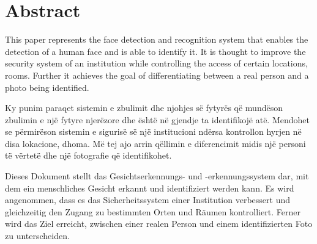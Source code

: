 \chapter*{Abstract}


\begin{flushleft}
	This paper represents the face detection and recognition system that enables the detection of a human face and is able to identify it. It is thought to improve the security system of an institution while controlling the access of certain locations, rooms. Further it achieves the goal of differentiating between a real person and a photo being identified. \\
\end{flushleft}
\begin{flushleft}
	Ky punim paraqet sistemin e zbulimit dhe njohjes së fytyrës që mundëson zbulimin e një fytyre njerëzore dhe është në gjendje ta identifikojë atë. Mendohet se përmirëson sistemin e sigurisë së një institucioni ndërsa kontrollon hyrjen në disa lokacione, dhoma. Më tej ajo arrin qëllimin e diferencimit midis një personi të vërtetë dhe një fotografie që identifikohet.
\end{flushleft}
\begin{flushleft}
	Dieses Dokument stellt das Gesichtserkennungs- und -erkennungssystem dar, mit dem ein menschliches Gesicht erkannt und identifiziert werden kann. Es wird angenommen, dass es das Sicherheitssystem einer Institution verbessert und gleichzeitig den Zugang zu bestimmten Orten und Räumen kontrolliert. Ferner wird das Ziel erreicht, zwischen einer realen Person und einem identifizierten Foto zu unterscheiden. \\
\end{flushleft}